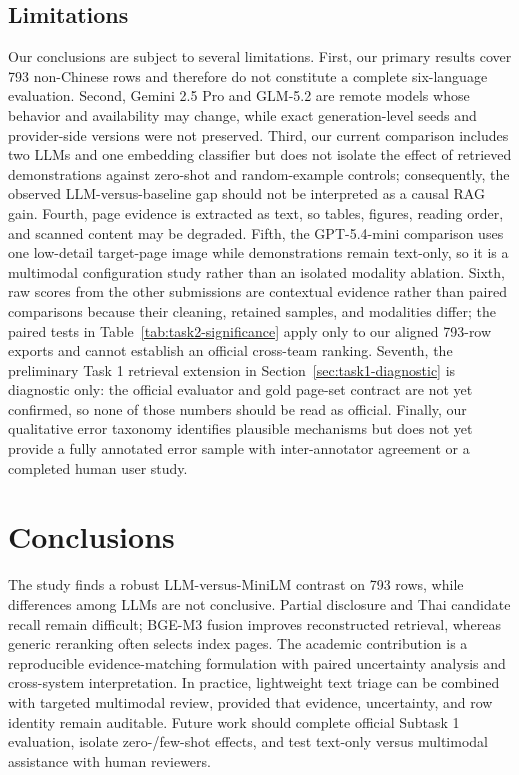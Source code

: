 \documentclass[sigconf,article]{acmart}
\begin{document}
\subsection{Limitations}
\label{sec:limitations}
Our conclusions are subject to several limitations. First, our primary results cover 793 non-Chinese rows and therefore do not constitute a complete six-language evaluation. Second, Gemini 2.5 Pro and GLM-5.2 are remote models whose behavior and availability may change, while exact generation-level seeds and provider-side versions were not preserved. Third, our current comparison includes two LLMs and one embedding classifier but does not isolate the effect of retrieved demonstrations against zero-shot and random-example controls; consequently, the observed LLM-versus-baseline gap should not be interpreted as a causal RAG gain. Fourth, page evidence is extracted as text, so tables, figures, reading order, and scanned content may be degraded. Fifth, the GPT-5.4-mini comparison uses one low-detail target-page image while demonstrations remain text-only, so it is a multimodal configuration study rather than an isolated modality ablation. Sixth, raw scores from the other submissions are contextual evidence rather than paired comparisons because their cleaning, retained samples, and modalities differ; the paired tests in Table~\ref{tab:task2-significance} apply only to our aligned 793-row exports and cannot establish an official cross-team ranking. Seventh, the preliminary Task 1 retrieval extension in Section~\ref{sec:task1-diagnostic} is diagnostic only: the official evaluator and gold page-set contract are not yet confirmed, so none of those numbers should be read as official. Finally, our qualitative error taxonomy identifies plausible mechanisms but does not yet provide a fully annotated error sample with inter-annotator agreement or a completed human user study.

\section{Conclusions}
The study finds a robust LLM-versus-MiniLM contrast on 793 rows, while differences among LLMs are not conclusive. Partial disclosure and Thai candidate recall remain difficult; BGE-M3 fusion improves reconstructed retrieval, whereas generic reranking often selects index pages. The academic contribution is a reproducible evidence-matching formulation with paired uncertainty analysis and cross-system interpretation. In practice, lightweight text triage can be combined with targeted multimodal review, provided that evidence, uncertainty, and row identity remain auditable. Future work should complete official Subtask 1 evaluation, isolate zero-/few-shot effects, and test text-only versus multimodal assistance with human reviewers.
\end{document}
